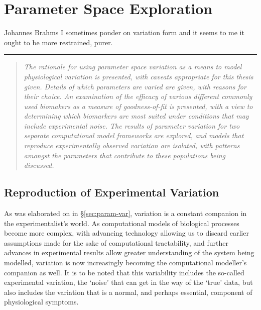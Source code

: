 \documentclass[../thesis-main.tex]{subfiles}
\begin{document}
\chapter{Parameter Space Exploration}
\label{ch:paramSpace}

\begin{aquote}{Johannes Brahms}
  {\selectfont
   I sometimes ponder on variation form and it seems to me it ought to be more restrained, purer.
  }
\end{aquote}
\rule{\linewidth}{0.25mm}

\begin{quote}
 \emph{The rationale for using parameter space variation as a means to model physiological variation is presented, with caveats appropriate for this thesis given. Details of which parameters are varied are given, with reasons for their choice. An examination of the efficacy of various different commonly used biomakers as a measure of goodness-of-fit is presented, with a view to determining which biomarkers are most suited under conditions that may include experimental noise. The results of parameter variation for two separate computational model frameworks are explored, and models that reproduce experimentally observed variation are isolated, with patterns amongst the parameters that contribute to these populations being discussed.}
\end{quote}

\section{Reproduction of Experimental Variation}
\label{sec:paramSpace-rationale}
As was elaborated on in \S\ref{sec:param-var}, variation is a constant companion in the experimentalist's world. As computational models of biological processes become more complex, with advancing technology allowing us to discard earlier assumptions made for the sake of computational tractability, and further advances in experimental results allow greater understanding of the system being modelled, variation is now increasingly becoming the computational modeller's companion as well. It is to be noted that this variability includes the so-called experimental variation, the `noise' that can get in the way of the `true' data, but also includes the variation that is a normal, and perhaps essential, component of physiological symptoms.
\end{document}
